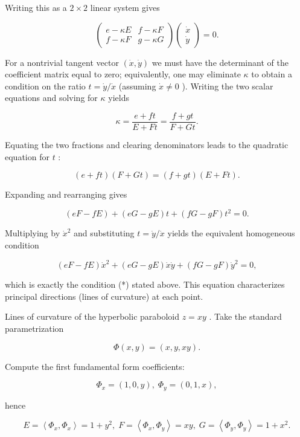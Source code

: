 \documentclass[10pt]{article}
\begin{document}
Writing this as a \(2 \times  2\) linear system gives

\[
\left( \begin{array}{ll} e - {\kappa E} & f - {\kappa F} \\  f - {\kappa F} & g - {\kappa G} \end{array}\right) \left( \begin{array}{l} \dot{x} \\  \dot{y} \end{array}\right)  = 0.
\]

For a nontrivial tangent vector \(\left( {\dot{x},\dot{y}}\right)\) we must have the determinant of the coefficient matrix equal to zero; equivalently, one may eliminate \(\kappa\) to obtain a condition on the ratio \(t = \dot{y}/\dot{x}\) (assuming \(\dot{x} \neq  0\) ). Writing the two scalar equations and solving for \(\kappa\) yields

\[
\kappa  = \frac{e + {ft}}{E + {Ft}} = \frac{f + {gt}}{F + {Gt}}.
\]

Equating the two fractions and clearing denominators leads to the quadratic equation for \(t\) :

\[
\left( {e + {ft}}\right) \left( {F + {Gt}}\right)  = \left( {f + {gt}}\right) \left( {E + {Ft}}\right) .
\]

Expanding and rearranging gives

\[
\left( {{eF} - {fE}}\right)  + \left( {{eG} - {gE}}\right) t + \left( {{fG} - {gF}}\right) {t}^{2} = 0.
\]

Multiplying by \({\dot{x}}^{2}\) and substituting \(t = \dot{y}/\dot{x}\) yields the equivalent homogeneous condition

\[
\left( {{eF} - {fE}}\right) {\dot{x}}^{2} + \left( {{eG} - {gE}}\right) \dot{x}\dot{y} + \left( {{fG} - {gF}}\right) {\dot{y}}^{2} = 0,
\]

which is exactly the condition (*) stated above. This equation characterizes principal directions (lines of curvature) at each point.

Lines of curvature of the hyperbolic paraboloid \(z = {xy}\) . Take the standard parametrization

\[
\Phi \left( {x,y}\right)  = \left( {x,y,{xy}}\right) .
\]

Compute the first fundamental form coefficients:

\[
{\Phi }_{x} = \left( {1,0,y}\right) ,\;{\Phi }_{y} = \left( {0,1,x}\right) ,
\]

hence

\[
E = \left\langle  {{\Phi }_{x},{\Phi }_{x}}\right\rangle   = 1 + {y}^{2},\;F = \left\langle  {{\Phi }_{x},{\Phi }_{y}}\right\rangle   = {xy},\;G = \left\langle  {{\Phi }_{y},{\Phi }_{y}}\right\rangle   = 1 + {x}^{2}.
\]
\end{document}
